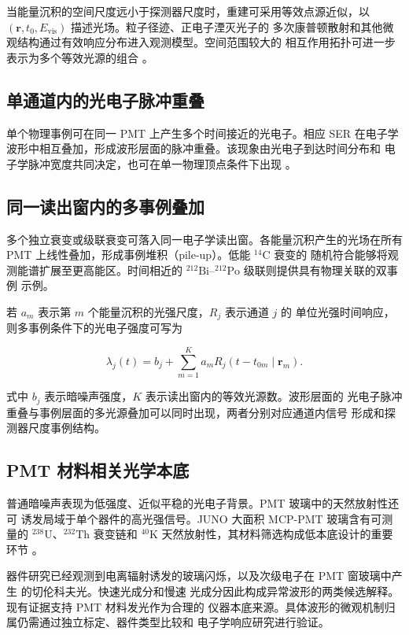 \documentclass[UTF8,a4paper,11pt]{ctexart}
\begin{document}
当能量沉积的空间尺度远小于探测器尺度时，重建可采用等效点源近似，以
\((\mathbf r,t_0,E_{\mathrm{vis}})\) 描述光场。粒子径迹、正电子湮灭光子的
多次康普顿散射和其他微观结构通过有效响应分布进入观测模型。空间范围较大的
相互作用拓扑可进一步表示为多个等效光源的组合
\cite{liu2018vertex,dou2023probe}。

\subsection{单通道内的光电子脉冲重叠}

单个物理事例可在同一 PMT 上产生多个时间接近的光电子。相应 SER 在电子学
波形中相互叠加，形成波形层面的脉冲重叠。该现象由光电子到达时间分布和
电子学脉冲宽度共同决定，也可在单一物理顶点条件下出现
\cite{wang2026fsmp}。

\subsection{同一读出窗内的多事例叠加}

多个独立衰变或级联衰变可落入同一电子学读出窗。各能量沉积产生的光场在所有
PMT 上线性叠加，形成事例堆积（pile-up）。低能 \(^{14}\mathrm{C}\) 衰变的
随机符合能够将观测能谱扩展至更高能区\cite{bellini2014pp}。时间相近的
\(^{212}\mathrm{Bi}\)--\(^{212}\mathrm{Po}\) 级联则提供具有物理关联的双事例
示例。

若 \(a_m\) 表示第 \(m\) 个能量沉积的光强尺度，\(R_j\) 表示通道 \(j\) 的
单位光强时间响应，则多事例条件下的光电子强度可写为

\[
\lambda_j(t)=b_j+\sum_{m=1}^{K}
a_m R_j(t-t_{0m}\mid\mathbf r_m).
\]

式中 \(b_j\) 表示暗噪声强度，\(K\) 表示读出窗内的等效光源数。波形层面的
光电子脉冲重叠与事例层面的多光源叠加可以同时出现，两者分别对应通道内信号
形成和探测器尺度事例结构。

\subsection{PMT 材料相关光学本底}

普通暗噪声表现为低强度、近似平稳的光电子背景。PMT 玻璃中的天然放射性还可
诱发局域于单个器件的高光强信号。JUNO 大面积 MCP-PMT 玻璃含有可测量的
\(^{238}\mathrm{U}\)、\(^{232}\mathrm{Th}\) 衰变链和
\(^{40}\mathrm{K}\) 天然放射性，其材料筛选构成低本底设计的重要环节
\cite{zhang2018glass}。

器件研究已经观测到电离辐射诱发的玻璃闪烁，以及次级电子在 PMT 窗玻璃中产生
的切伦科夫光\cite{bayat2014glass,roodbergen1972cherenkov}。快速光成分和慢速
光成分因此构成异常波形的两类候选解释。现有证据支持 PMT 材料发光作为合理的
仪器本底来源。具体波形的微观机制归属仍需通过独立标定、器件类型比较和
电子学响应研究进行验证。
\end{document}

